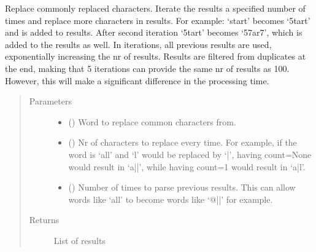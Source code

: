 \documentclass[letterpaper,10pt,english]{sphinxmanual}
\begin{document}
\begin{fulllineitems}
\begin{fulllineitems}
\label{\detokenize{EntroPass:EntroPass.pwd_gen.Pwd_gen.rep_cmmn_chars}}
\sphinxAtStartPar
Replace commonly replaced characters. Iterate the results a specified number of times
and replace more characters in results. For example: ‘start’ becomes ‘5tart’ and is
added to results. After second iteration ‘5tart’ becomes ‘57ar7’, which is added to
the results as well. In iterations, all previous results are used, exponentially increasing
the nr of results. Results are filtered from duplicates at the end, making that 5
iterations can provide the same nr of results as 100. However, this will make a
significant difference in the processing time.
\begin{quote}\begin{description}
\item[{Parameters}] \leavevmode\begin{itemize}
\item {} 
\sphinxAtStartPar
{} () \textendash{} Word to replace common characters from.

\item {} 
\sphinxAtStartPar
{} (\sphinxstyleliteralemphasis{\sphinxupquote{, }}) \textendash{} Nr of characters to replace every time. For example, if the word is ‘all’ and ‘l’
would be replaced by ‘|’, having count=None would result in ‘a||’, while having count=1
would result in ‘a|l’.

\item {} 
\sphinxAtStartPar
{} (\sphinxstyleliteralemphasis{\sphinxupquote{, }}) \textendash{} Number of times to parse previous results. This can allow words like ‘all’ to
become words like ‘@||’ for example.

\end{itemize}

\item[{Returns}] \leavevmode
\sphinxAtStartPar
{} \textendash{} List of results


\end{description}
\end{quote}
\end{fulllineitems}
\end{fulllineitems}
\end{document}
